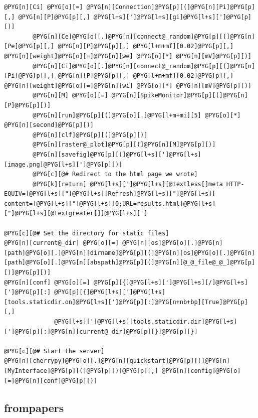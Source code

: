 \documentclass[letterpaper,10pt,english]{manual}
\begin{document}
\begin{Verbatim}[commandchars=@\[\]]
        @PYG[n][Ci] @PYG[o][=] @PYG[n][Connection]@PYG[p][(]@PYG[n][Pi]@PYG[p][,] @PYG[n][P]@PYG[p][,] @PYG[l+s][']@PYG[l+s][gi]@PYG[l+s][']@PYG[p][)]
        @PYG[n][Ce]@PYG[o][.]@PYG[n][connect@_random]@PYG[p][(]@PYG[n][Pe]@PYG[p][,] @PYG[n][P]@PYG[p][,] @PYG[l+m+mf][0.02]@PYG[p][,] @PYG[n][weight]@PYG[o][=]@PYG[n][we] @PYG[o][*] @PYG[n][mV]@PYG[p][)]
        @PYG[n][Ci]@PYG[o][.]@PYG[n][connect@_random]@PYG[p][(]@PYG[n][Pi]@PYG[p][,] @PYG[n][P]@PYG[p][,] @PYG[l+m+mf][0.02]@PYG[p][,] @PYG[n][weight]@PYG[o][=]@PYG[n][wi] @PYG[o][*] @PYG[n][mV]@PYG[p][)]
        @PYG[n][M] @PYG[o][=] @PYG[n][SpikeMonitor]@PYG[p][(]@PYG[n][P]@PYG[p][)]
        @PYG[n][run]@PYG[p][(]@PYG[o][.]@PYG[l+m+mi][5] @PYG[o][*] @PYG[n][second]@PYG[p][)]
        @PYG[n][clf]@PYG[p][(]@PYG[p][)]
        @PYG[n][raster@_plot]@PYG[p][(]@PYG[n][M]@PYG[p][)]
        @PYG[n][savefig]@PYG[p][(]@PYG[l+s][']@PYG[l+s][image.png]@PYG[l+s][']@PYG[p][)]
        @PYG[c][@# Redirect to the html page we wrote]
        @PYG[k][return] @PYG[l+s][']@PYG[l+s][@textless[]meta HTTP-EQUIV=]@PYG[l+s]["]@PYG[l+s][Refresh]@PYG[l+s]["]@PYG[l+s][ content=]@PYG[l+s]["]@PYG[l+s][0;URL=results.html]@PYG[l+s]["]@PYG[l+s][@textgreater[]]@PYG[l+s][']

@PYG[c][@# Set the directory for static files]
@PYG[n][current@_dir] @PYG[o][=] @PYG[n][os]@PYG[o][.]@PYG[n][path]@PYG[o][.]@PYG[n][dirname]@PYG[p][(]@PYG[n][os]@PYG[o][.]@PYG[n][path]@PYG[o][.]@PYG[n][abspath]@PYG[p][(]@PYG[n][@_@_file@_@_]@PYG[p][)]@PYG[p][)]
@PYG[n][conf] @PYG[o][=] @PYG[p][{]@PYG[l+s][']@PYG[l+s][/]@PYG[l+s][']@PYG[p][:] @PYG[p][{]@PYG[l+s][']@PYG[l+s][tools.staticdir.on]@PYG[l+s][']@PYG[p][:]@PYG[n+nb+bp][True]@PYG[p][,]
              @PYG[l+s][']@PYG[l+s][tools.staticdir.dir]@PYG[l+s][']@PYG[p][:]@PYG[n][current@_dir]@PYG[p][}]@PYG[p][}]

@PYG[c][@# Start the server]
@PYG[n][cherrypy]@PYG[o][.]@PYG[n][quickstart]@PYG[p][(]@PYG[n][MyInterface]@PYG[p][(]@PYG[p][)]@PYG[p][,] @PYG[n][config]@PYG[o][=]@PYG[n][conf]@PYG[p][)]
\end{Verbatim}


\subsection{frompapers}

\resetcurrentobjects
\hypertarget{--doc-examples-frompapers_Brette_Gerstner_2005}{}
\end{document}
